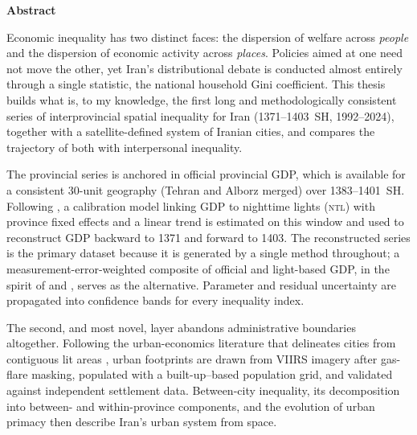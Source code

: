 \documentclass[11pt,a4paper]{article}
\newcommand{\NTL}{\textsc{ntl}}
\begin{document}
\thispagestyle{empty}
\begin{center}
{\sffamily\large\bfseries\color{navy} Abstract}
\end{center}
\vspace{-0.3em}
{\small
Economic inequality has two distinct faces: the dispersion of welfare across \emph{people} and the dispersion of economic activity across \emph{places}. Policies aimed at one need not move the other, yet Iran's distributional debate is conducted almost entirely through a single statistic, the national household Gini coefficient. This thesis builds what is, to my knowledge, the first long and methodologically consistent series of interprovincial spatial inequality for Iran (1371--1403~SH, 1992--2024), together with a satellite-defined system of Iranian cities, and compares the trajectory of both with interpersonal inequality.

The provincial series is anchored in official provincial GDP, which is available for a consistent 30-unit geography (Tehran and Alborz merged) over 1383--1401~SH. Following \citet{LessmannSeidel2017}, a calibration model linking GDP to nighttime lights (\NTL) with province fixed effects and a linear trend is estimated on this window and used to reconstruct GDP backward to 1371 and forward to 1403. The reconstructed series is the primary dataset because it is generated by a single method throughout; a measurement-error-weighted composite of official and light-based GDP, in the spirit of \citet{ChenNordhaus2011} and \citet{HendersonStoreygardWeil2012}, serves as the alternative. Parameter and residual uncertainty are propagated into confidence bands for every inequality index.

The second, and most novel, layer abandons administrative boundaries altogether. Following the urban-economics literature that delineates cities from contiguous lit areas \citep{Dingel2021,Harari2020}, urban footprints are drawn from VIIRS imagery after gas-flare masking, populated with a built-up--based population grid, and validated against independent settlement data. Between-city inequality, its decomposition into between- and within-province components, and the evolution of urban primacy then describe Iran's urban system from space.

}
\end{document}
